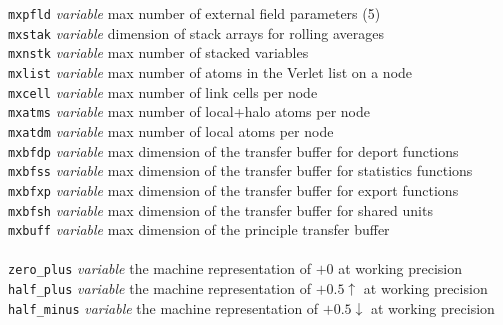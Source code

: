 \begin{tabbing}
\> {\tt mxpfld}      \> {\em variable}       \> max number of external field parameters (5) \\
\> {\tt mxstak}      \> {\em variable}       \> dimension of stack arrays for rolling averages \\
\> {\tt mxnstk}      \> {\em variable}       \> max number of stacked variables \\
\> {\tt mxlist}      \> {\em variable}       \> max number of atoms in the Verlet list on a node \\
\> {\tt mxcell}      \> {\em variable}       \> max number of link cells per node \\
\> {\tt mxatms}      \> {\em variable}       \> max number of local+halo atoms per node \\
\> {\tt mxatdm}      \> {\em variable}       \> max number of local atoms per node \\
\> {\tt mxbfdp}      \> {\em variable}       \> max dimension of the transfer buffer for deport functions \\
\> {\tt mxbfss}      \> {\em variable}       \> max dimension of the transfer buffer for statistics functions \\
\> {\tt mxbfxp}      \> {\em variable}       \> max dimension of the transfer buffer for export functions \\
\> {\tt mxbfsh}      \> {\em variable}       \> max dimension of the transfer buffer for shared units \\
\> {\tt mxbuff}      \> {\em variable}       \> max dimension of the principle transfer buffer \\
\>                   \>                      \> \\
\> {\tt zero\_plus}  \> {\em variable}       \> the machine representation of $+0$ at working precision \\
\> {\tt half\_plus}  \> {\em variable}       \> the machine representation of $+0.5\uparrow$ at working precision \\
\> {\tt half\_minus} \> {\em variable}       \> the machine representation of $+0.5\downarrow$ at working precision \\
\end{tabbing}
